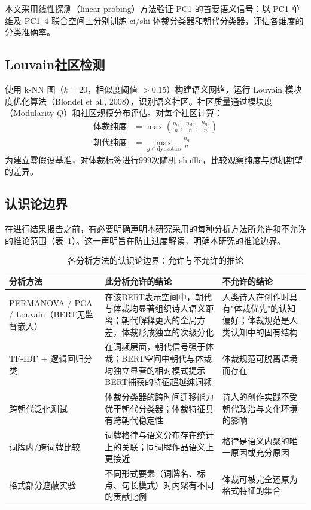 \documentclass[12pt,a4paper]{article}
\numberwithin{equation}{section}
\begin{document}
本文采用线性探测（linear probing）方法验证 PC1 的首要语义信号：以 PC1 单维及 PC1--4 联合空间上分别训练 ci/shi 体裁分类器和朝代分类器，评估各维度的分类准确率。

\subsection{Louvain社区检测}

使用 k-NN 图（$k=20$，相似度阈值 $>0.15$）构建语义网络，运行 Louvain 模块度优化算法（Blondel et al., 2008），识别语义社区。社区质量通过模块度（Modularity $Q$）和社区规模分布评估。对每个社区计算：
\begin{align}
\text{体裁纯度} &= \max\!\left(\frac{n_{\text{ci}}}{n},\,\frac{n_{\text{shi}}}{n},\,\frac{n_{\text{qu}}}{n}\right)\\
\text{朝代纯度}  &= \max_{g\in\text{dynasties}}\frac{n_g}{n}
\end{align}
为建立零假设基准，对体裁标签进行999次随机 shuffle，比较观察纯度与随机期望的差异。

\subsection{认识论边界}

在进行结果报告之前，有必要明确声明本研究采用的每种分析方法所允许和不允许的推论范围（表~\ref{tab:epistemic}）。这一声明旨在防止过度解读，明确本研究的推论边界。

\begin{table}[htbp]
  \centering
  \caption{各分析方法的认识论边界：允许与不允许的推论}
  \label{tab:epistemic}
  \small
  \begin{tabular}{p{3.5cm}p{5cm}p{5cm}}
    \toprule
    分析方法 & 此分析允许的结论 & 不允许的结论 \\
    \midrule
    PERMANOVA / PCA / Louvain（BERT无监督嵌入） & 在该BERT表示空间中，朝代与体裁均显著组织诗人语义距离；朝代解释更大的全局方差，体裁形成独立的次级分化 & 人类诗人在创作时具有"体裁优先"的认知偏好；体裁规范是人类认知中的固有结构 \\
    \midrule
    TF-IDF + 逻辑回归分类 & 在词频层面，朝代信号强于体裁；BERT空间中朝代与体裁均独立显著的相对模式提示BERT捕获的特征超越纯词频 & 体裁规范可脱离语境而存在 \\
    \midrule
    跨朝代泛化测试 & 体裁分类器的跨时间迁移能力优于朝代分类器；体裁特征具有跨朝代稳定性 & 诗人的创作实践不受朝代政治与文化环境的影响 \\
    \midrule
    词牌内/跨词牌比较 & 词牌格律与语义分布存在统计上的关联；同词牌作品语义上更接近 & 格律是语义内聚的唯一原因或充分原因 \\
    \midrule
    格式部分遮蔽实验 & 不同形式要素（词牌名、标点、句长模式）对内聚有不同的贡献比例 & 体裁可被完全还原为格式特征的集合 \\
    \bottomrule
  \end{tabular}
\end{table}
\end{document}
